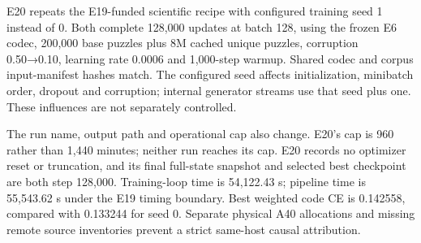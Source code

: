 \documentclass[
  british,
]{article}
\begin{document}
E20 repeats the E19-funded scientific recipe with configured training
seed 1 instead of 0. Both complete 128,000 updates at batch 128, using
the frozen E6 codec, 200,000 base puzzles plus 8M cached unique puzzles,
corruption 0.50→0.10, learning rate 0.0006 and 1,000-step warmup. Shared
codec and corpus input-manifest hashes match. The configured seed
affects initialization, minibatch order, dropout and corruption;
internal generator streams use that seed plus one. These influences are
not separately controlled.

The run name, output path and operational cap also change. E20's cap is
960 rather than 1,440 minutes; neither run reaches its cap. E20 records
no optimizer reset or truncation, and its final full-state snapshot and
selected best checkpoint are both step 128,000. Training-loop time is
54,122.43 s; pipeline time is 55,543.62 s under the E19 timing boundary.
Best weighted code CE is 0.142558, compared with 0.133244 for seed 0.
Separate physical A40 allocations and missing remote source inventories
prevent a strict same-host causal attribution.
\end{document}
